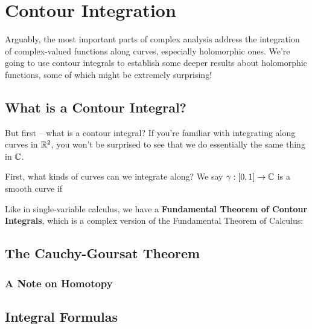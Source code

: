 \section{Contour Integration}

Arguably, the most important parts of complex analysis address the integration of complex-valued functions along curves, especially holomorphic ones. We're going to use contour integrals to establish some deeper results about holomorphic functions, some of which might be extremely surprising!

\subsection{What is a Contour Integral?}
But first -- what is a contour integral? If you're familiar with integrating along curves in $\mathbb R^2$, you won't be surprised to see that we do essentially the same thing in $\mathbb C$.

First, what kinds of curves can we integrate along? We say $\gamma : [0,1] \to \mathbb C$ is a smooth curve if


Like in single-variable calculus, we have a \textbf{Fundamental Theorem of Contour Integrals}, which is a complex version of the Fundamental Theorem of Calculus:

\subsection{The Cauchy-Goursat Theorem}
\begin{theorem}

\end{theorem}

\subsubsection{A Note on Homotopy}


\subsection{Integral Formulas}

